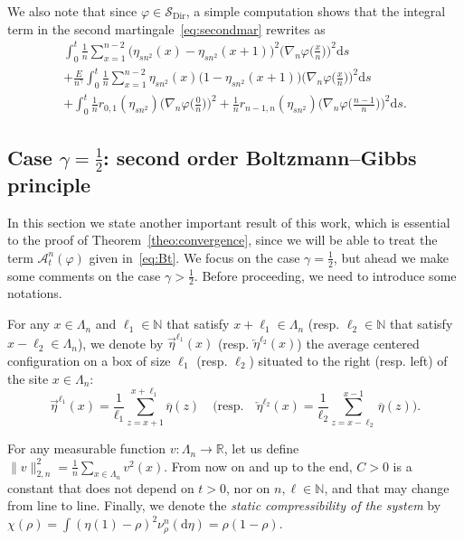 \documentclass[AHL,Unicode,longabstracts]{cedram}
\DeclareMathOperator{\Dir}{Dir}
\newcommand{\bb}[1]{{\mathbb #1}}
\newcommand{\mc}[1]{{\mathcal #1}}
\renewcommand{\mc}[1]{{\mathcal #1}}
\newcommand{\SD}{\ensuremath{\mc S_{\Dir}}}
\renewcommand\vec[1]{\overrightarrow{#1}}
\newcommand\vecleft[1]{\overleftarrow{#1}}
\renewcommand{\bar}{\overline}
\newcommand*{\dd}{\mathrm{d}}
\newcommand*{\ds}{\dd s}
\renewcommand{\tfrac}{\frac}
\begin{document}
We also note that since $\varphi\in \SD$, a simple computation shows that the integral term in the second martingale~\eqref{eq:secondmar} rewrites as
\begin{multline}\label{eq:QV_density}
\int_0^t\frac{1}{n}\sum_{x=1}^{n-2} \big(\eta_{sn^2}(x)-\eta_{sn^2}(x+1)\big)^2 \Big(\nabla_n\varphi\Big(\frac{x}{n}\Big)\Big)^2\ds \\
+ \frac{E}{n^\gamma} \int_0^t\frac{1}{n}\sum_{x=1}^{n-2}\eta_{sn^2}(x)\big(1-\eta_{sn^2}(x+1)\big) \Big(\nabla_n\varphi\Big(\frac{x}{n}\Big)\Big)^2\ds\\
+ \int_0^t\frac{1}{n} r_{0,1}(\eta_{sn^2}) \Big(\nabla_n\varphi\Big(\frac{0}{n}\Big)\Big)^2+\frac{1}{n} r_{n-1,n}(\eta_{sn^2}) \Big(\nabla_n\varphi\Big(\frac{n-1}{n}\Big)\Big)^2\ds.
\end{multline}

\subsection{Case \texorpdfstring{$\gamma=\tfrac12$}{gamma=1/2}: second order Boltzmann--Gibbs principle} \label{sec:BG}

In this section we state another important result of this work, which is essential to the proof of Theorem~\ref{theo:convergence}, since we will be able to treat the term $ \mc A_t^n(\varphi)$ given in~\eqref{eq:Bt}. We focus on the case $\gamma=\frac12$, but ahead we make some comments on the case $\gamma>\frac12$. Before proceeding, we need to introduce some notations.

\begin{defi}
For any $x\in\Lambda_n$ and $\ell_1 \in \bb N$ that satisfy $x+\ell_1 \in \Lambda_n$ (resp. $\ell_2 \in \bb N$ that satisfy $x-\ell_2 \in \Lambda_n$), we denote by $\vec\eta^{\ell_1}(x)$ (resp. $\vecleft\eta^{\ell_2}(x)$) the average centered configuration on a box of size $\ell_1$ (resp. $\ell_2$) situated to the right (resp. left) of the site $x \in \Lambda_n$:
\[
\vec\eta^{\ell_1}(x)=\frac{1}{\ell_1}\sum_{z=x+1}^{x+\ell_1} \bar\eta(z)\quad \bigg(\text{resp.} \quad
\vecleft\eta^{\ell_2}(x)=\frac{1}{\ell_2}\sum_{z=x-\ell_2}^{x-1}\bar\eta(z)\bigg).
\]
\end{defi}

For any measurable function $v:\Lambda_n\to\bb R$, let us define $\|v\|_{2,n}^2=\frac{1}{n}\sum_{x\in\Lambda_n}v^2(x).$ From now on and up to the end, $C>0$ is a constant that does not depend on $t > 0$, nor on $n,\ell \in \mathbb{N}$, and that may change from line to line. Finally, we denote the \emph{static compressibility of the system} by $\chi(\rho) = \int (\eta(1)-\rho)^2 \nu_\rho^n(\dd\eta) = \rho(1-\rho)$.
\end{document}

